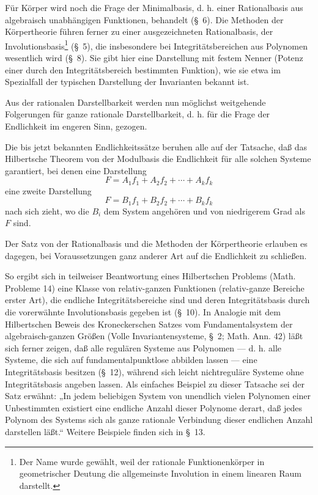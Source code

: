 Für Körper wird noch die Frage der Minimalbasis, d. h. einer Rationalbasis aus algebraisch unabhängigen Funktionen, behandelt (\S\ 6). Die Methoden der Körpertheorie führen ferner zu einer ausgezeichneten Rationalbasis, der Involutionsbasis\footnote{Der Name wurde gewählt, weil der rationale Funktionenkörper in geometrischer Deutung die allgemeinste Involution in einem linearen Raum darstellt.} (\S\ 5), die insbesondere bei Integritätsbereichen aus Polynomen wesentlich wird (\S\ 8). Sie gibt hier eine Darstellung mit festem Nenner (Potenz einer durch den Integritätsbereich bestimmten Funktion), wie sie etwa im Spezialfall der typischen Darstellung der Invarianten bekannt ist.

Aus der rationalen Darstellbarkeit werden nun möglichst weitgehende Folgerungen für ganze rationale Darstellbarkeit, d. h. für die Frage der Endlichkeit im engeren Sinn, gezogen.

Die bis jetzt bekannten Endlichkeitssätze beruhen alle auf der Tatsache, daß das Hilbertsche Theorem von der Modulbasis die Endlichkeit für alle solchen Systeme garantiert, bei denen eine Darstellung
\[
  F=A_1f_1+A_2f_2+\cdots+A_kf_k
\]
eine zweite Darstellung
\[
  F=B_1f_1+B_2f_2+\cdots+B_kf_k
\]
nach sich zieht, wo die $B_i$ dem System angehören und von niedrigerem Grad als $F$ sind.

Der Satz von der Rationalbasis und die Methoden der Körpertheorie erlauben es dagegen, bei Voraussetzungen ganz anderer Art auf die Endlichkeit zu schließen.

So ergibt sich in teilweiser Beantwortung eines Hilbertschen Problems (Math. Probleme 14) eine Klasse von relativ-ganzen Funktionen (relativ-ganze Bereiche erster Art), die endliche Integritätsbereiche sind und deren Integritätsbasis durch die vorerwähnte Involutionsbasis gegeben ist (\S\ 10). In Analogie mit dem Hilbertschen Beweis des Kroneckerschen Satzes vom Fundamentalsystem der algebraisch-ganzen Größen (Volle Invariantensysteme, \S\ 2; Math. Ann. 42) läßt sich ferner zeigen, daß alle regulären Systeme aus Polynomen --- d. h. alle Systeme, die sich auf fundamentalpunktlose abbilden lassen --- eine Integritätsbasis besitzen (\S\ 12), während sich leicht nichtreguläre Systeme ohne Integritätsbasis angeben lassen. Als einfaches Beispiel zu dieser Tatsache sei der Satz erwähnt: „In jedem beliebigen System von unendlich vielen Polynomen einer Unbestimmten existiert eine endliche Anzahl dieser Polynome derart, daß jedes Polynom des Systems sich als ganze rationale Verbindung dieser endlichen Anzahl darstellen läßt.“ Weitere Beispiele finden sich in \S\ 13.

